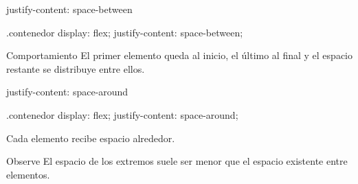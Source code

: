 \documentclass[aspectratio=169,11.5pt]{beamer}
\begin{document}
    \begin{frame}[fragile]{justify-content: space-between}
        \begin{csscodedark}
            .contenedor {
                display: flex;
                justify-content: space-between;
            }
        \end{csscodedark}

        \begin{center}
        \end{center}

        \begin{block}{Comportamiento}
            El primer elemento queda al inicio,
            el último al final y el espacio restante
            se distribuye entre ellos.
        \end{block}
    \end{frame}

    \begin{frame}[fragile]{justify-content: space-around}
        \begin{csscodedark}
            .contenedor {
                display: flex;
                justify-content: space-around;
            }
        \end{csscodedark}

        \begin{center}
        \end{center}

        Cada elemento recibe espacio alrededor.

        \begin{alertblock}{Observe}
            El espacio de los extremos suele ser menor
            que el espacio existente entre elementos.
        \end{alertblock}
    \end{frame}
\end{document}

